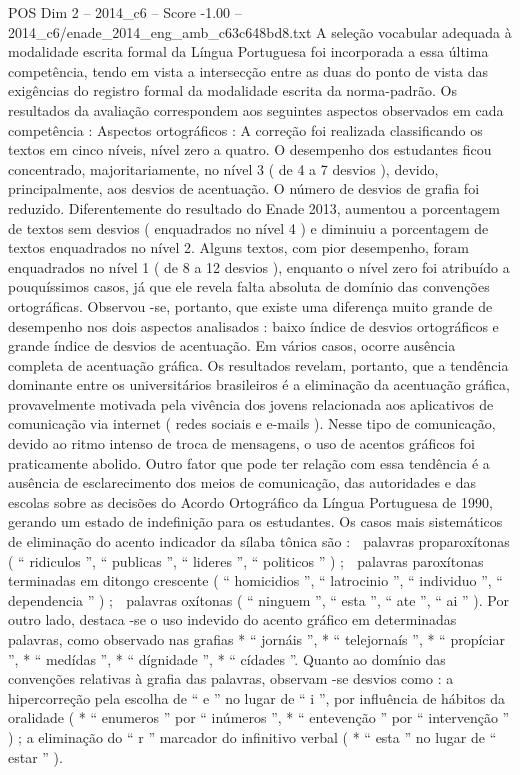 \begin{textsample}{POS Dim 2 – 2014\_c6 – Score -1.00 – 2014\_c6/enade\_2014\_eng\_amb\_c63c648bd8.txt}
A seleção vocabular adequada à modalidade escrita formal da Língua Portuguesa foi incorporada a essa última competência, tendo em vista a intersecção entre as duas do ponto de vista das exigências do registro formal da modalidade escrita da norma-padrão.
Os resultados da avaliação correspondem aos seguintes aspectos observados em cada competência : Aspectos ortográficos : A correção foi realizada classificando os textos em cinco níveis, nível zero a quatro.
O desempenho dos estudantes ficou concentrado, majoritariamente, no nível 3 ( de 4 a 7 desvios ), devido, principalmente, aos desvios de acentuação.
O número de desvios de grafia foi reduzido.
Diferentemente do resultado do Enade 2013, aumentou a porcentagem de textos sem desvios ( enquadrados no nível 4 ) e diminuiu a porcentagem de textos enquadrados no nível 2.
Alguns textos, com pior desempenho, foram enquadrados no nível 1 ( de 8 a 12 desvios ), enquanto o nível zero foi atribuído a pouquíssimos casos, já que ele revela falta absoluta de domínio das convenções ortográficas.
Observou -se, portanto, que existe uma diferença muito grande de desempenho nos dois aspectos analisados : baixo índice de desvios ortográficos e grande índice de desvios de acentuação.
Em vários casos, ocorre ausência completa de acentuação gráfica.
Os resultados revelam, portanto, que a tendência dominante entre os universitários brasileiros é a eliminação da acentuação gráfica, provavelmente motivada pela vivência dos jovens relacionada aos aplicativos de comunicação via internet ( redes sociais e e-mails ).
Nesse tipo de comunicação, devido ao ritmo intenso de troca de mensagens, o uso de acentos gráficos foi praticamente abolido.
Outro fator que pode ter relação com essa tendência é a ausência de esclarecimento dos meios de comunicação, das autoridades e das escolas sobre as decisões do Acordo Ortográfico da Língua Portuguesa de 1990, gerando um estado de indefinição para os estudantes.
Os casos mais sistemáticos de eliminação do acento indicador da sílaba tônica são :  palavras proparoxítonas ( “ ridiculos ”, “ publicas ”, “ lideres ”, “ politicos ” ) ;  palavras paroxítonas terminadas em ditongo crescente ( “ homicidios ”, “ latrocinio ”, “ individuo ”, “ dependencia ” ) ;  palavras oxítonas ( “ ninguem ”, “ esta ”, “ ate ”, “ ai ” ).
Por outro lado, destaca -se o uso indevido do acento gráfico em determinadas palavras, como observado nas grafias * “ jornáis ”, * “ telejornaís ”, * “ propíciar ”, * “ medídas ”, * “ dígnidade ”, * “ cídades ”.
Quanto ao domínio das convenções relativas à grafia das palavras, observam -se desvios como : a hipercorreção pela escolha de “ e ” no lugar de “ i ”, por influência de hábitos da oralidade ( * “ enumeros ” por “ inúmeros ”, * “ entevenção ” por “ intervenção ” ) ; a eliminação do “ r ” marcador do infinitivo verbal ( * “ esta ” no lugar de “ estar ” ).

\end{textsample}
